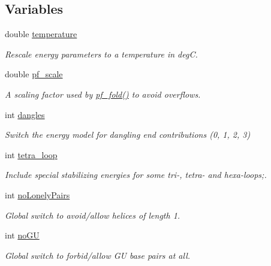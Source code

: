 \subsection*{Variables}
\begin{DoxyCompactItemize}
\item 
double \hyperlink{group__model__details_gab4b11c8d9c758430960896bc3fe82ead}{temperature}
\begin{DoxyCompactList}\small\item\em Rescale energy parameters to a temperature in degC. \end{DoxyCompactList}\item 
double \hyperlink{group__model__details_gad3b22044065acc6dee0af68931b52cfd}{pf\+\_\+scale}
\begin{DoxyCompactList}\small\item\em A scaling factor used by \hyperlink{group__part__func__global__deprecated_gadc3db3d98742427e7001a7fd36ef28c2}{pf\+\_\+fold()} to avoid overflows. \end{DoxyCompactList}\item 
int \hyperlink{group__model__details_ga72b511ed1201f7e23ec437e468790d74}{dangles}
\begin{DoxyCompactList}\small\item\em Switch the energy model for dangling end contributions (0, 1, 2, 3) \end{DoxyCompactList}\item 
int \hyperlink{group__model__details_ga4f6265bdf0ead7ff4628a360adbfd77e}{tetra\+\_\+loop}
\begin{DoxyCompactList}\small\item\em Include special stabilizing energies for some tri-\/, tetra-\/ and hexa-\/loops;. \end{DoxyCompactList}\item 
int \hyperlink{group__model__details_ga097eccaabd6ae8b4fef83cccff85bb5d}{no\+Lonely\+Pairs}
\begin{DoxyCompactList}\small\item\em Global switch to avoid/allow helices of length 1. \end{DoxyCompactList}\item 
\mbox{\label{group__model__details_gabf380d09e4f1ab94fc6af57cf0ad5d32}} 
int \hyperlink{group__model__details_gabf380d09e4f1ab94fc6af57cf0ad5d32}{no\+GU}
\begin{DoxyCompactList}\small\item\em Global switch to forbid/allow GU base pairs at all. \end{DoxyCompactList}\item 

\end{DoxyCompactItemize}
